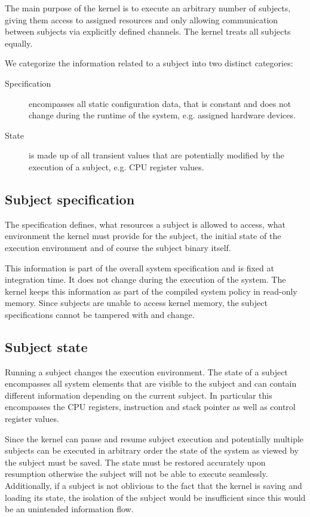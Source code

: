 The main purpose of the kernel is to execute an arbitrary number of subjects,
giving them access to assigned resources and only allowing communication between
subjects via explicitly defined channels. The kernel treats all subjects equally.

We categorize the information related to a subject into two distinct categories:

\begin{description}
	\item[Specification] encompasses all static configuration data, that is
		constant and does not change during the runtime of the system, e.g.
		assigned hardware devices.
	\item[State] is made up of all transient values that are potentially modified
		by the execution of a subject, e.g. CPU register values.
\end{description}

\subsection{Subject specification}
The specification defines, what resources a subject is allowed to access, what
environment the kernel must provide for the subject, the initial state of the
execution environment and of course the subject binary itself.

This information is part of the overall system specification and is fixed at
integration time. It does not change during the execution of the system. The
kernel keeps this information as part of the compiled system policy in read-only
memory. Since subjects are unable to access kernel memory, the subject
specifications cannot be tampered with and change.

\subsection{Subject state}
Running a subject changes the execution environment. The state of a subject
encompasses all system elements that are visible to the subject and can contain
different information depending on the current subject. In particular this
encompasses the CPU registers, instruction and stack pointer as well as control
register values.

Since the kernel can pause and resume subject execution and potentially multiple
subjects can be executed in arbitrary order the state of the system as viewed by
the subject must be saved. The state must be restored accurately upon resumption
otherwise the subject will not be able to execute seamlessly. Additionally, if a
subject is not oblivious to the fact that the kernel is saving and loading its
state, the isolation of the subject would be insufficient since this would be an
unintended information flow.

